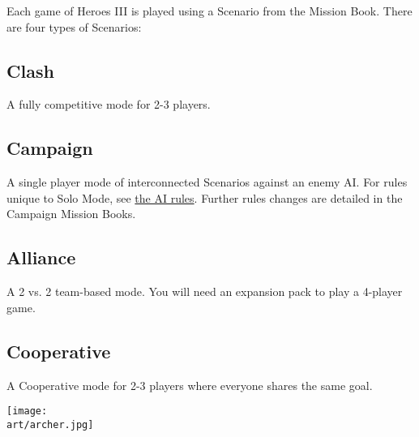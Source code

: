 
\begin{multicols*}{2}

Each game of Heroes III is played using a Scenario from the Mission Book.
There are four types of Scenarios:

\subsection*{Clash}
A fully competitive mode for 2-3 players.

\subsection*{Campaign}
A single player mode of interconnected Scenarios against an enemy AI.
For rules unique to Solo Mode, see \hyperlink{AIrules}{the AI rules}.
Further rules changes are detailed in the Campaign Mission Books.

\subsection*{Alliance}
A 2 vs. 2 team-based mode.
You will need an expansion pack to play a 4-player game.

\subsection*{Cooperative}
A Cooperative mode for 2-3 players where everyone shares the same goal.

\vspace*{\fill}

\columnbreak

\texttt{[image: \\art/archer.jpg]}

\end{multicols*}
